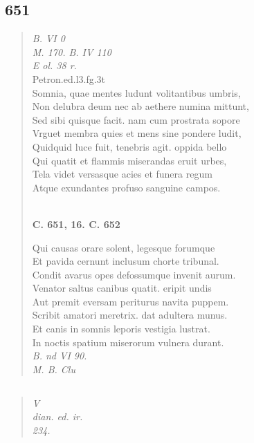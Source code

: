 \documentclass[11pt, a4paper]{report}
\begin{document}
            \subsection*{651}
      \begin{verse}
      \textit{B. VI 0} \\ \textit{M. 170. B. IV 110} \\ \textit{E ol. 38 r.} \\ Petron.ed.l3.fg.3t \\ Somnia, quae mentes ludunt volitantibus umbris, \\ Non delubra deum nec ab aethere numina mittunt, \\ Sed sibi quisque facit. nam cum prostrata sopore \\ Vrguet membra quies et mens sine pondere ludit, \\ Quidquid luce fuit, tenebris agit. oppida bello \\ Qui quatit et flammis miserandas eruit urbes, \\ Tela videt versasque acies et funera regum \\ Atque exundantes profuso sanguine campos. \\ 
        ﻿\pagebreak 
    \begin{center} \textbf{C. 651, 16. C. 652} \end{center} \marginpar{[120]} Qui causas orare solent, legesque forumque \\ Et pavida cernunt inclusum chorte tribunal. \\ Condit avarus opes defossumque invenit aurum. \\ Venator saltus canibus quatit. eripit undis \\ Aut premit eversam periturus navita puppem. \\ Scribit amatori meretrix. dat adultera munus. \\ Et canis in somnis leporis vestigia lustrat. \\ In noctis spatium miserorum vulnera durant. \\ \textit{B. nd VI 90.} \\ \textit{M. B. Clu} \\ 
      \end{verse}
  
            \subsection*{}
      \begin{verse}
      \textit{V} \\ \textit{dian. ed. ir.} \\ \textit{234.} \\ 
      \end{verse}
  
\end{document}
